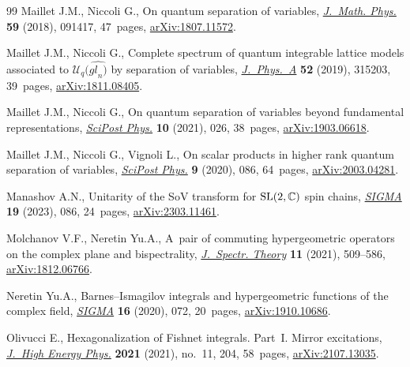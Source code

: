 \documentclass[pdftex]{sigma}
\numberwithin{equation}{section}
\begin{document}
\begin{thebibliography}{99}
Maillet J.M., Niccoli G., On quantum separation of variables,
 \href{https://doi.org/10.1063/1.5050989}{\textit{J.~Math. Phys.}} \textbf{59}
 (2018), 091417, 47~pages,
 \href{http://arxiv.org/abs/1807.11572}{arXiv:1807.11572}.

Maillet J.M., Niccoli G., Complete spectrum of quantum integrable lattice
 models associated to {$\mathcal{U}_q(\widehat{{gl}_n)}$} by separation of
 variables,
 \href{https://doi.org/10.1088/1751-8121/ab2930}{\textit{J.~Phys.~A}}
 \textbf{52} (2019), 315203, 39~pages,
 \href{http://arxiv.org/abs/1811.08405}{arXiv:1811.08405}.

Maillet J.M., Niccoli G., On quantum separation of variables beyond fundamental
 representations,
 \href{https://doi.org/10.21468/scipostphys.10.2.026}{\textit{SciPost Phys.}}
 \textbf{10} (2021), 026, 38~pages,
 \href{http://arxiv.org/abs/1903.06618}{arXiv:1903.06618}.

Maillet J.M., Niccoli G., Vignoli L., On scalar products in higher rank quantum
 separation of variables,
 \href{https://doi.org/10.21468/SciPostPhys.9.6.086}{\textit{SciPost Phys.}}
 \textbf{9} (2020), 086, 64~pages,
 \href{http://arxiv.org/abs/2003.04281}{arXiv:2003.04281}.

Manashov A.N., Unitarity of the {S}o{V} transform for {${\rm SL}(2,\mathbb C)$}
 spin chains, \href{https://doi.org/10.3842/SIGMA.2023.086}{\textit{SIGMA}}
 \textbf{19} (2023), 086, 24~pages,
 \href{http://arxiv.org/abs/2303.11461}{arXiv:2303.11461}.

Molchanov V.F., Neretin Yu.A., A~pair of commuting hypergeometric operators on
 the complex plane and bispectrality,
 \href{https://doi.org/10.4171/jst/349}{\textit{J.~Spectr. Theory}}
 \textbf{11} (2021), 509--586,
 \href{http://arxiv.org/abs/1812.06766}{arXiv:1812.06766}.

Neretin Yu.A., Barnes--{I}smagilov integrals and hypergeometric functions of the
 complex field, \href{https://doi.org/10.3842/SIGMA.2020.072}{\textit{SIGMA}}
 \textbf{16} (2020), 072, 20~pages,
 \href{http://arxiv.org/abs/1910.10686}{arXiv:1910.10686}.

Olivucci E., Hexagonalization of {F}ishnet integrals. {P}art~{I}. {M}irror
 excitations, \href{https://doi.org/10.1007/jhep11(2021)204}{\textit{J.~High
 Energy Phys.}} \textbf{2021} (2021), no.~11, 204, 58~pages,
 \href{http://arxiv.org/abs/2107.13035}{arXiv:2107.13035}.


\end{thebibliography}
\end{document}
